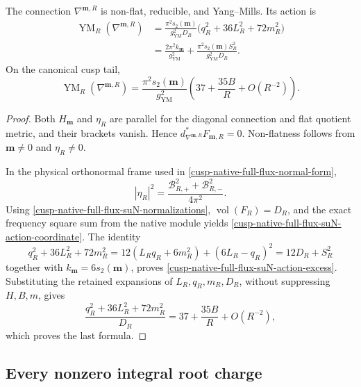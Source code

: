 \begin{theorem}
\label{cusp-native-full-flux-suN-action-theorem}
The connection \(\nabla^{\mathbf m,R}\) is non-flat, reducible, and
Yang--Mills.  Its action is
\begin{align}
 \operatorname{YM}_R(\nabla^{\mathbf m,R})
 &=\frac{\pi^2s_2(\mathbf m)}{g_{\mathrm{YM}}^2D_R}
   \bigl(q_R^2+36L_R^2+72m_R^2\bigr)
 \label{cusp-native-full-flux-suN-action-coordinate}\\
 &=\frac{2\pi^2k_{\mathbf m}}{g_{\mathrm{YM}}^2}
   +\frac{\pi^2s_2(\mathbf m)S_R^2}
          {g_{\mathrm{YM}}^2D_R}.
 \label{cusp-native-full-flux-suN-action-excess}
\end{align}
On the canonical cusp tail,
\begin{equation}
 \operatorname{YM}_R(\nabla^{\mathbf m,R})
 =\frac{\pi^2s_2(\mathbf m)}{g_{\mathrm{YM}}^2}
 \left(37+\frac{35B}{R}+O(R^{-2})\right).
 \label{cusp-native-full-flux-suN-action-asymptotic}
\end{equation}
\end{theorem}

\begin{proof}
Both \(H_{\mathbf m}\) and \(\eta_R\) are parallel for the diagonal
connection and flat quotient metric, and their brackets vanish.  Hence
\(d_{\nabla^{\mathbf m,R}}^*F_{\mathbf m,R}=0\).  Non-flatness follows
from \(\mathbf m\ne0\) and \(\eta_R\ne0\).

In the physical orthonormal frame used in
\cref{cusp-native-full-flux-normal-form},
\[
 |\eta_R|^2
 =\frac{\mathcal B_{R,+}^2+\mathcal B_{R,-}^2}{4\pi^2}.
\]
Using \cref{cusp-native-full-flux-suN-normalizations},
\(\operatorname{vol}(F_R)=D_R\), and the exact frequency square sum from
the native module yields
\cref{cusp-native-full-flux-suN-action-coordinate}.  The identity
\[
 q_R^2+36L_R^2+72m_R^2
 =12(L_R q_R+6m_R^2)+(6L_R-q_R)^2
 =12D_R+S_R^2
\]
together with \(k_{\mathbf m}=6s_2(\mathbf m)\), proves
\cref{cusp-native-full-flux-suN-action-excess}.  Substituting the retained
expansions of \(L_R,q_R,m_R,D_R\), without suppressing \(H,B,m\), gives
\[
 \frac{q_R^2+36L_R^2+72m_R^2}{D_R}
 =37+\frac{35B}{R}+O(R^{-2}),
\]
which proves the last formula.
\end{proof}

\subsection{Every nonzero integral root charge}

